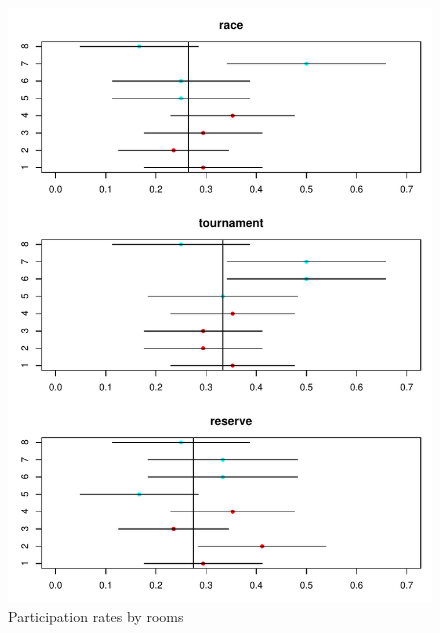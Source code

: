 \documentclass[12pt,]{article}
\theoremstyle{plain} %
\begin{document}
\begin{figure}
\centering
\includegraphics{Figures/unnamed-chunk-13-1.pdf}
\caption{Participation rates by rooms}
\end{figure}

\renewcommand\refname{References}

\end{document}
